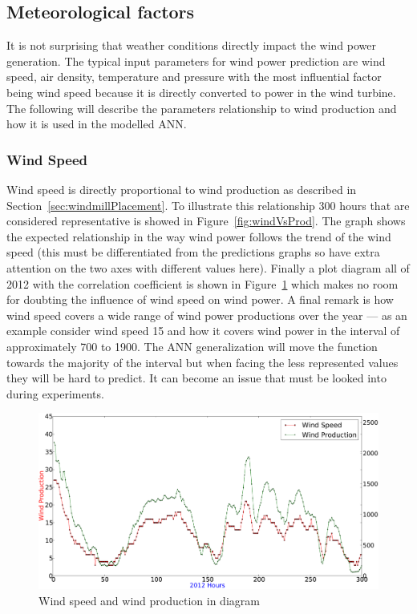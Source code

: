 \subsection{Meteorological factors}
It is not surprising that weather conditions directly impact the wind power generation. The typical input parameters for wind power prediction are wind speed, air density, temperature and pressure \cite{WindPowerGenerationUsingANN} with the most influential factor being wind speed because it is directly converted to power in the wind turbine. The following will describe the parameters relationship to wind production and how it is used in the modelled ANN.

\subsubsection{Wind Speed}
\label{sec:windPowerWindSpeed}
Wind speed is directly proportional to wind production as described in Section~\ref{sec:windmillPlacement}. To illustrate this relationship 300 hours that are considered representative is showed in Figure~\ref{fig:windVsProd}.  The graph shows the expected relationship in the way wind power follows the trend of the wind speed (this must be differentiated from the predictions graphs so have extra attention on the two axes with different values here). Finally a plot diagram all of 2012 with the correlation coefficient is shown in Figure~\ref{fig:windSpeedWindProductionPlot} which makes no room for doubting the influence of wind speed on wind power. A final remark is how wind speed covers a wide range of wind power productions over the year --- as an example consider wind speed 15 and how it covers wind power in the interval of approximately 700 to 1900. The ANN generalization will move the function towards the majority of the interval but when facing the less represented values they will be hard to predict. It can become an issue that must be looked into during experiments.  

\begin{figure}[H]
\centering
\includegraphics[width=0.99\linewidth,natwidth=898,natheight=587]{billeder/windSpeedWindProductionPlot.png}
\caption{Wind speed and wind production in diagram}
\label{fig:windSpeedWindProductionPlot}
\end{figure}

